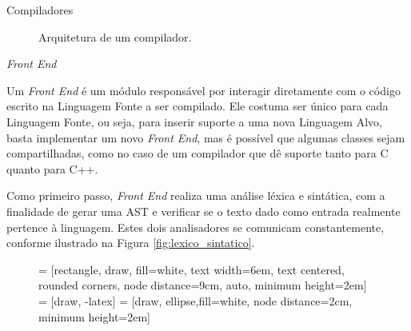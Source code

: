 \begin{section}{Compiladores}
\begin{figure}
\begin{center}
{
}
\end{center}

\caption{Arquitetura de um compilador.}
\label{fig:compiler_arch}
\end{figure}

\begin{subsection}{\textit{Front End}}

Um \textit{Front End} é um módulo responsável por interagir diretamente com o
código escrito na Linguagem Fonte a ser compilado. Ele costuma ser único
para cada Linguagem Fonte, ou seja, para inserir suporte a uma nova
Linguagem Alvo, basta implementar um novo \textit{Front End}, mas é 
possível que algumas classes sejam
compartilhadas, como no caso de um compilador que dê suporte tanto para C quanto para C++. 


Como primeiro passo, \textit {Front End} realiza uma análise
léxica e sintática, com a finalidade de gerar uma AST e verificar
se o texto dado como entrada realmente pertence à linguagem.
Estes dois analisadores se comunicam constantemente, conforme ilustrado na Figura
\ref{fig:lexico_sintatico}.


\begin{figure}
 = [rectangle, draw, fill=white,
    text width=6em, text centered, rounded corners, node distance=9cm, auto, minimum height=2em]
 = [draw, -latex]
 = [draw, ellipse,fill=white, node distance=2cm,
    minimum height=2em]

\begin{center}
\end{center}
\end{figure}
\end{subsection}
\end{section}
